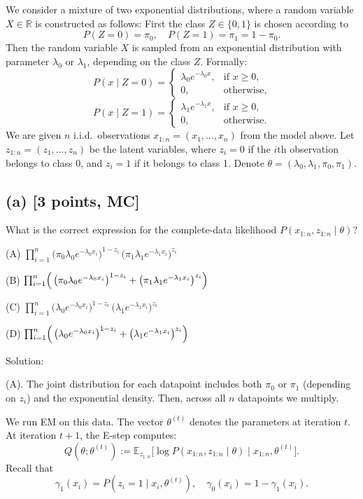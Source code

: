 \documentclass[twocolumn]{article}
\begin{document}
\begin{spacing}{1}
We consider a mixture of two exponential distributions, where a random variable \(X\in\mathbb{R}\) is constructed as follows: First the class \(Z\in\{0,1\}\) is chosen according to
\[
P(Z=0)=\pi_0,\quad P(Z=1)=\pi_1=1-\pi_0.
\]
Then the random variable \(X\) is sampled from an exponential distribution with parameter \(\lambda_0\) or \(\lambda_1\), depending on the class \(Z\). Formally:
\[
P(x\mid Z=0)=
\begin{cases}
\lambda_0 e^{-\lambda_0 x}, & \text{if }x\ge 0,\\
0, & \text{otherwise},
\end{cases}
\]
\[
P(x\mid Z=1)=
\begin{cases}
\lambda_1 e^{-\lambda_1 x}, & \text{if }x\ge 0,\\
0, & \text{otherwise}.
\end{cases}
\]
We are given \(n\) i.i.d.\ observations \(x_{1:n} = (x_1,\ldots,x_n)\) from the model above. Let \(z_{1:n} = (z_1,\ldots,z_n)\) be the latent variables, where \(z_i=0\) if the \(i\)th observation belongs to class 0, and \(z_i=1\) if it belongs to class 1. Denote \(\theta=(\lambda_0,\lambda_1,\pi_0,\pi_1)\).

\subsection*{(a) [3 points, MC]}
What is the correct expression for the complete-data likelihood \(P(x_{1:n}, z_{1:n}\mid \theta)\)?

(A) \(\prod_{i=1}^n \bigl(\pi_0 \lambda_0 e^{-\lambda_0 x_i}\bigr)^{1-z_i}\,\bigl(\pi_1 \lambda_1 e^{-\lambda_1 x_i}\bigr)^{z_i}\)

(B) \(\prod_{i=1}^n \Bigl(\,\bigl(\pi_0 \lambda_0 e^{-\lambda_0 x_i}\bigr)^{1-z_i} + \bigl(\pi_1 \lambda_1 e^{-\lambda_1 x_i}\bigr)^{z_i}\Bigr)\)

(C) \(\prod_{i=1}^n \bigl(\lambda_0 e^{-\lambda_0 x_i}\bigr)^{1-z_i}\,\bigl(\lambda_1 e^{-\lambda_1 x_i}\bigr)^{z_i}\)

(D) \(\prod_{i=1}^n \Bigl(\,\bigl(\lambda_0 e^{-\lambda_0 x_i}\bigr)^{1-z_i} + \bigl(\lambda_1 e^{-\lambda_1 x_i}\bigr)^{z_i}\Bigr)\)

Solution:

(A). The joint distribution for each datapoint includes both \(\pi_0\) or \(\pi_1\) (depending on \(z_i\)) and the exponential density. Then, across all \(n\) datapoints we multiply.

We run EM on this data. The vector \(\theta^{(t)}\) denotes the parameters at iteration \(t\). At iteration \(t+1\), the E-step computes:
\[
Q(\theta;\theta^{(t)}) 
:= \mathbb{E}_{z_{1:n}}\bigl[\log P(x_{1:n},z_{1:n}\mid \theta)\mid x_{1:n},\theta^{(t)}\bigr].
\]
Recall that 
\[
\gamma_1(x_i) = P(z_i=1\mid x_i,\theta^{(t)}), 
\quad \gamma_0(x_i) = 1 - \gamma_1(x_i).
\]


\end{spacing}
\end{document}
